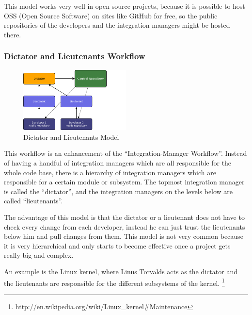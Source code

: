 This model works very well in open source projects, because it is possible to host OSS (Open Source Software) on 
sites like GitHub for free, so the public repositories of the developers and the integration managers might be hosted there.


\subsubsection{Dictator and Lieutenants Workflow}

\begin{figure}[ht]
  \centering
  \includegraphics[width=0.5\textwidth]{img/Mod_Dictator}
  \caption{Dictator and Lieutenants Model}
  \label{fig:mod_dictator} 
\end{figure}

This workflow is an enhancement of the “Integration-Manager Workflow”. Instead of having a handful of 
integration managers which are all responsible for the whole code base, there is a hierarchy of integration 
managers which are responsible for a certain module or subsystem. The topmost integration manager is called 
the “dictator”, and the integration managers on the levels below are called “lieutenants”.

The advantage of this model is that the dictator or a lieutenant does not have to check every change from 
each developer, instead he can just trust the lieutenants below him and pull changes from them. This model 
is not very common because it is very hierarchical and only starts to become effective once a project gets really big and complex.

An example is the Linux kernel, where Linus Torvalds acts as the dictator and the lieutenants are 
responsible for the different subsystems of the kernel. \footnote{http://en.wikipedia.org/wiki/Linux\_kernel\#Maintenance}
